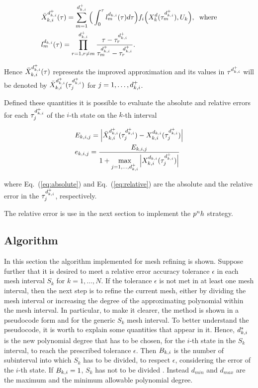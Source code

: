 \begin{subequations}
\begin{align}
	&\bar{X}_{k,i}^{d_{k,i}^{+}} (\tau) = \sum_{m=1}^{d_{k,i}^{+}}\Big(\int_{0}^{\tau}l_{m}^{d_{k,i}} (\tau)d\tau\Big) f_i\Big(X_{k}^{d}(\tau^{{d}_{k,i}^{+}}_m), U_k\Big), \hspace{2mm} \text{where} \label{eq:barX}\\
	&  l_{m}^{d_{k,i}} (\tau) = \prod_{r=1, r\neq m}^{d_{k,i}^{+}} \dfrac{\tau - \tau^{{d}_{k,i}^{+}}_r}{\tau^{{d}_{k,i}^{+}}_m - \tau^{{d}_{k,i}^{+}}_r}. \label{eq:meshlm}
\end{align}

\end{subequations}

Hence $\bar{X}_{k,i}^{d_{k,i}^{+}} (\tau)$ represents the improved approximation and its values in $\tau^{{d}_{k,i}^{+}}$ will be denoted by $\bar{X}_{k,i}^{d_{k,i}^{+}} (\tau^{{d}_{k,i}^{+}}_j)$ for $j = 1, \dots, d_{k,i}^{+}$.

Defined these quantities it is possible to evaluate the absolute and relative errors for each $\tau^{{d}_{k,i}^{+}}_j$ of the $i$-th state on the $k$-th interval

\begin{subequations}
	\begin{align}
	&E_{k,i,j} = \Big|\bar{X}_{k,i}^{d_{k,i}^{+}} (\tau^{{d}_{k,i}^{+}}_j) - X_{k,i}^{d_{k,i}} (\tau^{{d}_{k,i}^{+}}_j)\Big| \label{eq:absolute}\\
	&e_{k,i,j} = \dfrac{E_{k,i,j}}{1 + \max\limits_{j= 1, \dots, d_{k,i}^{+}} \Big| X_{k,i}^{d_{k,i}} (\tau^{{d}_{k,i}^{+}}_j)\Big|} \label{eq:relative} 
	\end{align}
\end{subequations}

where Eq.~(\ref{eq:absolute}) and Eq.~(\ref{eq:relative}) are the absolute and the relative error in the $\tau^{{d}_{k,i}^{+}}_j$, respectively.

The relative error is use in the next section to implement the $p^{n}h$ strategy.

\subsection*{Algorithm}
In this section the algorithm implemented for mesh refining is shown. 
Suppose further that it is desired to meet a relative error accuracy tolerance $\epsilon$ in each mesh
interval $S_k$ for $k = 1, \dots, N$. If the tolerance  $\epsilon$  is not met in at least one mesh interval, then the next step is to refine the current mesh, either by dividing the mesh interval or increasing the degree of the approximating polynomial within the mesh interval.
In particular, to make it clearer, the method is shown in a pseudocode form and for the generic $S_k$ mesh interval.
To better understand the pseudocode, it is worth to explain some quantities that appear in it.
Hence, $d_{k,i}^{*}$ is the new polynomial degree that has to be chosen, for the $i$-th state in the $S_k$ interval, to reach the prescribed tolerance $\epsilon$. Then $B_{k,i}$ is the number of subinterval into which $S_k$ has to be divided, to respect $\epsilon$, considering the error of the $i$-th state. If $B_{k,i} = 1$, $S_k$ has not to be divided . Instead $d_{min}$ and $d_{max}$ are the maximum and the minimum allowable polynomial degree.

